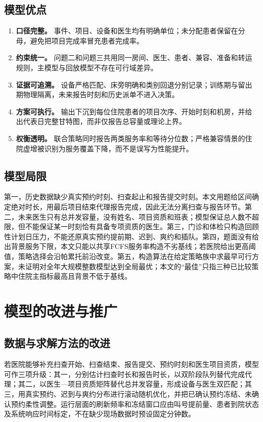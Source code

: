 \subsection{模型优点}

\begin{enumerate}
  \item \textbf{口径完整。} 事件、项目、设备和医生均有明确单位；未分配患者保留在分母，避免把项目完成率冒充患者完成率。
  \item \textbf{约束统一。} 问题二和问题三共用同一房间、医生、患者、兼容、准备和转运规则，主模型与回放模型不存在可行域差异。
  \item \textbf{证据可追溯。} 设备严格匹配、床旁明确和类别回退分别记录；训练期与留出期物理隔离，未来报告时刻和历史派单不进入决策。
  \item \textbf{方案可执行。} 输出下沉到每位住院患者的项目次序、开始时刻和机房，并给出代表日完整甘特图，而非仅报告总容量或理论上界。
  \item \textbf{权衡透明。} 联合策略同时报告两类服务率和等待分位数；严格兼容情景的住院虚增被识别为服务覆盖下降，而不是误写为性能提升。
\end{enumerate}

\subsection{模型局限}

第一，历史数据缺少真实预约时刻、扫查起止和报告提交时刻。本文用题给区间确定绝对时长，用最后项目结束代理报告完成，因此无法分离扫查与报告环节。第二，未来医生只有总并发容量，没有姓名、项目资质和班表；模型保证总人数不超限，但不能保证某一时刻恰有具备专项资质的医生。第三，门诊和体检只构造回顾性计划日压力，不能还原真实预约提前期、迟到、爽约和插队。第四，题面没有给出背景服务下限，本文只能以共享FCFS服务率构造不劣基线；若医院给出更高阈值，策略选择会沿帕累托前沿改变。第五，构造算法在给定策略族中求最早可行方案，未证明对全年大规模整数模型达到全局最优；本文的“最佳”只指三种已比较策略中住院主指标最高且背景不低于基线。

\section{模型的改进与推广}

\subsection{数据与求解方法的改进}

若医院能够补充扫查开始、扫查结束、报告提交、预约时刻和医生项目资质，模型可作三项升级：其一，分别估计扫查时长和报告时长，以双阶段队列替代完成代理；其二，以医生—项目资质矩阵替代总并发容量，形成设备与医生双匹配；其三，用真实预约、迟到与爽约分布进行滚动随机优化，并把已确认预约冻结、未确认预约柔性调整。运行层面的刷新频率和冻结窗口应由叫号提前量、患者到院状态及系统响应时间标定，不在缺少现场数据时预设固定分钟数。

